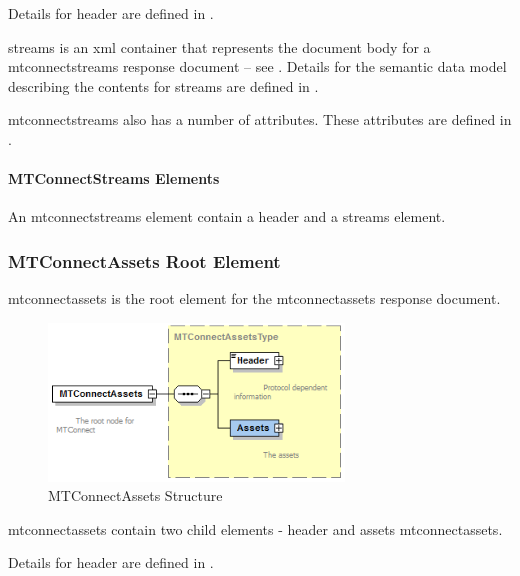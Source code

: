 Details for \gls{header} are defined in .  

\gls{streams} is an \gls{xml} container that represents the \gls{document body} for a \gls{mtconnectstreams response document} -- see .  Details for the \gls{semantic data model} describing the contents for \gls{streams} are defined in .

\gls{mtconnectstreams} also has a number of attributes.  These attributes are defined in .

\newpage

\paragraph{MTConnectStreams Elements}\mbox{}

An \gls{mtconnectstreams} element \MUST contain a \gls{header} and a \gls{streams} element.



\subsubsection{MTConnectAssets Root Element}

\gls{mtconnectassets} is the \gls{root element} for the \gls{mtconnectassets response document}.  

\begin{figure}[ht]
  \centering
  \includegraphics[width=0.7\textwidth]{figures/mtconnectassets-structure.png}
  \caption{MTConnectAssets Structure}
  \label{fig:mtconnectassets-structure}
\end{figure}

\FloatBarrier

\newpage 

\gls{mtconnectassets} \MUST contain two \glspl{child element} - \gls{header} and \gls{assets mtconnectassets}.

Details for \gls{header} are defined in .  

